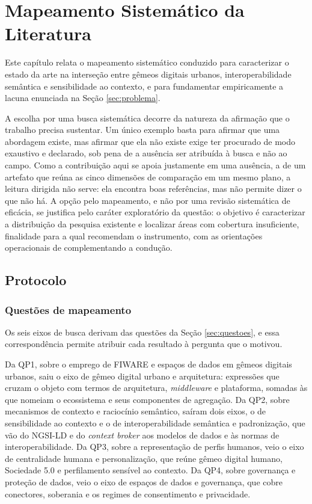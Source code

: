 \chapter{Mapeamento Sistemático da Literatura}
\label{cap:mapeamento}

Este capítulo relata o mapeamento sistemático conduzido para caracterizar o estado da arte na interseção entre gêmeos digitais urbanos, interoperabilidade semântica e sensibilidade ao contexto, e para fundamentar empiricamente a lacuna enunciada na Seção \ref{sec:problema}.

A escolha por uma busca sistemática decorre da natureza da afirmação que o trabalho precisa sustentar. Um único exemplo basta para afirmar que uma abordagem existe, mas afirmar que ela não existe exige ter procurado de modo exaustivo e declarado, sob pena de a ausência ser atribuída à busca e não ao campo. Como a contribuição aqui se apoia justamente em uma ausência, a de um artefato que reúna as cinco dimensões de comparação em um mesmo plano, a leitura dirigida não serve: ela encontra boas referências, mas não permite dizer o que não há. A opção pelo mapeamento, e não por uma revisão sistemática de eficácia, se justifica pelo caráter exploratório da questão: o objetivo é caracterizar a distribuição da pesquisa existente e localizar áreas com cobertura insuficiente, finalidade para a qual  recomendam o instrumento, com as orientações operacionais de  complementando a condução.

\section{Protocolo}
\label{sec:protocolo}

\subsection{Questões de mapeamento}

Os seis eixos de busca derivam das questões da Seção \ref{sec:questoes}, e essa correspondência permite atribuir cada resultado à pergunta que o motivou.

Da QP1, sobre o emprego de FIWARE e espaços de dados em gêmeos digitais urbanos, saiu o eixo de gêmeo digital urbano e arquitetura: expressões que cruzam o objeto com termos de arquitetura, \textit{middleware} e plataforma, somadas às que nomeiam o ecossistema e seus componentes de agregação. Da QP2, sobre mecanismos de contexto e raciocínio semântico, saíram dois eixos, o de sensibilidade ao contexto e o de interoperabilidade semântica e padronização, que vão do NGSI-LD e do \textit{context broker} aos modelos de dados e às normas de interoperabilidade. Da QP3, sobre a representação de perfis humanos, veio o eixo de centralidade humana e personalização, que reúne gêmeo digital humano, Sociedade 5.0 e perfilamento sensível ao contexto. Da QP4, sobre governança e proteção de dados, veio o eixo de espaços de dados e governança, que cobre conectores, soberania e os regimes de consentimento e privacidade.

